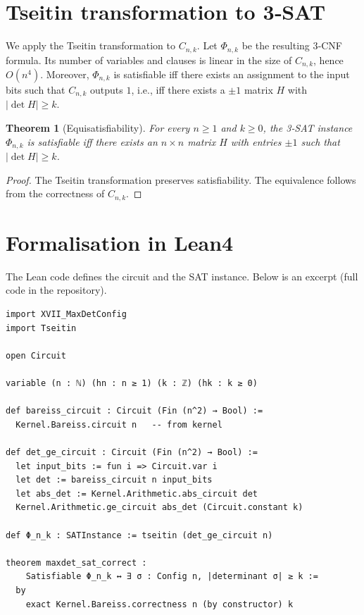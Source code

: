 \documentclass[11pt,a4paper]{article}
\newtheorem{theorem}{Theorem}[section]
\begin{document}
\section{Tseitin transformation to 3‑SAT}

We apply the Tseitin transformation to $C_{n,k}$. Let $\Phi_{n,k}$ be the resulting 3‑CNF formula. Its number of variables and clauses is linear in the size of $C_{n,k}$, hence $O(n^4)$. Moreover, $\Phi_{n,k}$ is satisfiable iff there exists an assignment to the input bits such that $C_{n,k}$ outputs $1$, i.e., iff there exists a $\pm1$ matrix $H$ with $|\det H| \ge k$.

\begin{theorem}[Equisatisfiability]
For every $n\ge 1$ and $k\ge 0$, the 3‑SAT instance $\Phi_{n,k}$ is satisfiable iff there exists an $n\times n$ matrix $H$ with entries $\pm1$ such that $|\det H| \ge k$.
\end{theorem}
\begin{proof}
The Tseitin transformation preserves satisfiability. The equivalence follows from the correctness of $C_{n,k}$.
\end{proof}

\section{Formalisation in Lean4}

The Lean code defines the circuit and the SAT instance. Below is an excerpt (full code in the repository).

\begin{lstlisting}[style=lean, caption={XVII_MaxDetSAT.lean (excerpt)}]
import XVII_MaxDetConfig
import Tseitin

open Circuit

variable (n : ℕ) (hn : n ≥ 1) (k : ℤ) (hk : k ≥ 0)

def bareiss_circuit : Circuit (Fin (n^2) → Bool) :=
  Kernel.Bareiss.circuit n   -- from kernel

def det_ge_circuit : Circuit (Fin (n^2) → Bool) :=
  let input_bits := fun i => Circuit.var i
  let det := bareiss_circuit n input_bits
  let abs_det := Kernel.Arithmetic.abs_circuit det
  Kernel.Arithmetic.ge_circuit abs_det (Circuit.constant k)

def Φ_n_k : SATInstance := tseitin (det_ge_circuit n)

theorem maxdet_sat_correct :
    Satisfiable Φ_n_k ↔ ∃ σ : Config n, |determinant σ| ≥ k :=
  by
    exact Kernel.Bareiss.correctness n (by constructor) k
\end{lstlisting}
\end{document}
